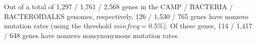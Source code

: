 Out of a total of 1,297 / 1,761 / 2,568 genes in the CAMP / BACTERIA / BACTEROIDALES genomes, respectively, 126 / 1,530 / 765 genes have nonzero mutation rates (using the threshold $minfreq=0.5\%$). Of these genes, 114 / 1,417 / 648 genes have nonzero nonsynonymous mutation rates.\endinput
